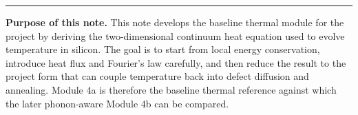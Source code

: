 \documentclass[11pt]{article}
\begin{document}

\hrule
\vspace{0.8em}

\begin{overviewbox}
\textbf{Purpose of this note.} This note develops the baseline thermal module for the project by deriving the two-dimensional continuum heat equation used to evolve temperature in silicon. The goal is to start from local energy conservation, introduce heat flux and Fourier's law carefully, and then reduce the result to the project form that can couple temperature back into defect diffusion and annealing. Module 4a is therefore the baseline thermal reference against which the later phonon-aware Module 4b can be compared.
\end{overviewbox}

\ProjectTOC


\SymbolsAcronymsSection
\end{document}

